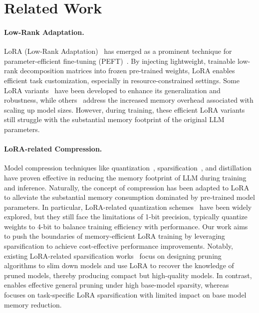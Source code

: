 \section{Related Work}
\paragraph{Low-Rank Adaptation.} 
LoRA (Low-Rank Adaptation)~\citep{Edw:2022lora} has emerged as a prominent technique for parameter-efficient fine-tuning (PEFT)~\citep{Prefix2021,Brian:2021PT,P-Tuning2021,Qiu:OFT2023,liu2024boft,Liu:2022IA3}. 
By injecting lightweight, trainable low-rank decomposition matrices into frozen pre-trained weights, LoRA enables efficient task customization, especially in resource-constrained settings.
Some LoRA variants~\citep{liu2024dora,ding2023sora,zi2023deltalora,zhang2023adalora,kala2023rslora} have been developed to enhance its generalization and robustness,
while others~\citep{zhou:2024loradrop,zhang2023lorafa,kopiczko2024vera,azizi2024lamda,wang2024prolora} address the increased memory overhead associated with scaling up model sizes.
However, during training, these efficient LoRA variants still struggle with the substantial memory footprint of the original LLM parameters.

\paragraph{LoRA-related Compression.}
Model compression techniques like quantization~\citep{han2015deep, jacob2018quantization,nagel2019data,zhao2019improving,yao2022zeroquant,park2022nuqmm,dettmers2022llm,xiao2022smoothquant,frantar2022gptq}, sparsification~\citep{molchanov2016pruning,liu2018rethinking,he2019filter,hoefler2021sparsity,frantar2023massive,liu2023deja,bansal2022rethinking}, and distillation~\citep{hinton2015distilling,cho2019efficacy,tang2019distilling,touvron2021training,Hsieh:2023distill,gu2024minillm} have proven effective in reducing the memory footprint of LLM during training and inference.
Naturally, the concept of compression has been adapted to LoRA to alleviate the substantial memory consumption dominated by pre-trained model parameters.
In particular, LoRA-related quantization schemes~\citep{Tim:2023qlora,Xu:2023QALoRA,li2024loftq,guo2024lqlora,OPTQ2023,chai2023int21} have been widely explored, but they still face the limitations of 1-bit precision, typically quantize weights to 4-bit to balance training efficiency with performance.  
Our work aims to push the boundaries of memory-efficient LoRA training by leveraging sparsification to achieve cost-effective performance improvements. 
Notably, existing LoRA-related sparsification works~\citep{chen2023lorashear,zhang2024loraprune} focus on designing pruning algorithms to slim down models and use LoRA to recover the knowledge of pruned models, thereby producing compact but high-quality models. In contrast, \method enables effective general pruning under high base-model sparsity, whereas~\citep{gu-etal-2024-light} focuses on task-specific LoRA sparsification with limited impact on base model memory reduction.

